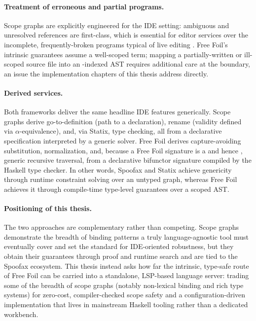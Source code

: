 \paragraph{Treatment of erroneous and partial programs.}
Scope graphs are explicitly engineered for the IDE setting: ambiguous and unresolved references are first-class, which is essential for editor services over the incomplete, frequently-broken programs typical of live editing \cite{scopeGraphs2015}. 
Free Foil's intrinsic guarantees assume a well-scoped term; mapping a partially-written or ill-scoped source file into an -indexed AST requires additional care at the boundary, an issue the implementation chapters of this thesis address directly.

\paragraph{Derived services.}
Both frameworks deliver the same headline IDE features generically. 
Scope graphs derive go-to-definition (path to a declaration), rename (validity defined via $\alpha$-equivalence), and, via Statix, type checking, all from a declarative specification interpreted by a generic solver. 
Free Foil derives capture-avoiding substitution, normalization, and, because a Free Foil signature is a  and hence , generic recursive traversal, from a declarative bifunctor signature compiled by the Haskell type checker. 
In other words, Spoofax and Statix achieve genericity through runtime constraint solving over an untyped graph, whereas Free Foil achieves it through compile-time type-level guarantees over a scoped AST.

\paragraph{Positioning of this thesis.}
The two approaches are complementary rather than competing. 
Scope graphs demonstrate the breadth of binding patterns a truly language-agnostic tool must eventually cover and set the standard for IDE-oriented robustness, but they obtain their guarantees through proof and runtime search and are tied to the Spoofax ecosystem. 
This thesis instead asks how far the intrinsic, type-safe route of Free Foil can be carried into a standalone, LSP-based language server: trading some of the breadth of scope graphs (notably non-lexical binding and rich type systems) for zero-cost, compiler-checked scope safety and a configuration-driven implementation that lives in mainstream Haskell tooling rather than a dedicated workbench.

